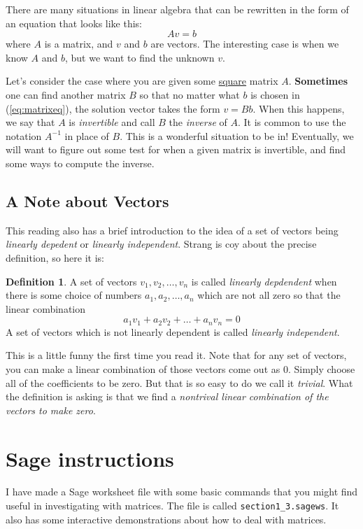 \documentclass[11pt]{amsart}
\theoremstyle{definition}
\newtheorem*{definition}{Definition}
\begin{document}
There are many situations in linear algebra that can be rewritten in the form of an equation that looks like this:
\[\label{eq:matrixeq} \tag{*}
A v = b
\]
where $A$ is a matrix, and $v$ and $b$ are vectors. The interesting case is when we know $A$ and $b$, but we want to find the unknown $v$.

Let's consider the case where you are given some \underline{square} matrix $A$.
\textbf{Sometimes} one can find another matrix $B$ so that no matter what $b$ is chosen in (\ref{eq:matrixeq}), the solution vector takes the form $v = Bb$. When this happens, we say that $A$ is \emph{invertible} and call $B$ the \emph{inverse} of $A$. It is common to use the notation $A^{-1}$ in place of $B$. This is a wonderful situation to be in! Eventually, we will want to figure out some test for when a given matrix is invertible, and find some ways to compute the inverse.

\subsection{A Note about Vectors}

This reading also has a brief introduction to the idea of a set of vectors being \emph{linearly depedent} or \emph{linearly independent}. Strang is coy about the precise definition, so here it is:

\begin{definition} A set of vectors $v_1, v_2, \dots, v_n$ is called \emph{linearly depdendent} when there is some choice of numbers $a_1, a_2, \dots, a_n$ which are not all zero so that the linear combination
\[
a_1 v_1 + a_2 v_2 + \dots + a_n v_n = 0
\]
A set of vectors which is not linearly dependent is called \emph{linearly independent}.
\end{definition}

This is a little funny the first time you read it. Note that for any set of vectors, you can make a linear combination of those vectors come out as $0$. Simply choose all of the coefficients to be zero. But that is so easy to do we call it \emph{trivial}. What the definition is asking is that we find a \emph{nontrival linear combination of the vectors to make zero}.


\section{Sage instructions}

I have made a Sage worksheet file with some basic commands that you might find useful in investigating with matrices. The file is called \texttt{section1\_3.sagews}. It also has some interactive demonstrations about how to deal with matrices.
\end{document}

